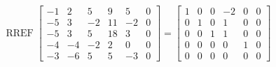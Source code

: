 \begin{exerciseAnswer} 


\[\operatorname{RREF} \left[\begin{array}{ccccc|c}
-1 & 2 & 5 & 9 & 5 & 0 \\
-5 & 3 & -2 & 11 & -2 & 0 \\
-5 & 3 & 5 & 18 & 3 & 0 \\
-4 & -4 & -2 & 2 & 0 & 0 \\
-3 & -6 & 5 & 5 & -3 & 0
\end{array}\right] = \left[\begin{array}{ccccc|c}
1 & 0 & 0 & -2 & 0 & 0 \\
0 & 1 & 0 & 1 & 0 & 0 \\
0 & 0 & 1 & 1 & 0 & 0 \\
0 & 0 & 0 & 0 & 1 & 0 \\
0 & 0 & 0 & 0 & 0 & 0
\end{array}\right] \]



\end{exerciseAnswer}
